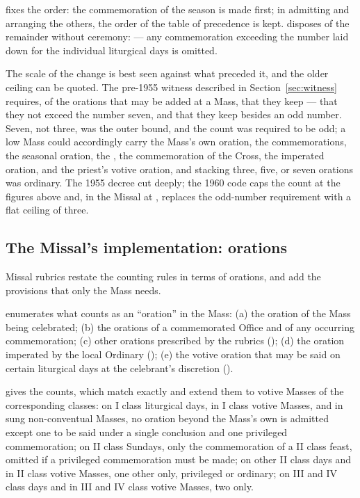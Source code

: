  fixes the order: the commemoration of the season is made first; in admitting and
arranging the others, the order of the table of precedence is kept.  disposes of the
remainder without ceremony:  — any commemoration exceeding the number laid down for
the individual liturgical days is omitted.

The scale of the change is best seen against what preceded it, and the older ceiling can be
quoted. The pre-1955 witness described in Section~\ref{sec:witness} requires, of the orations
that may be added at a Mass, that they  keep — that they not exceed the number seven, and that they keep besides an
odd number. Seven, not three, was the outer bound, and the count was required to be odd; a low
Mass could accordingly carry the Mass's own oration, the commemorations, the seasonal oration,
the , the commemoration of the Cross, the imperated oration, and the priest's
votive oration, and stacking three, five, or seven orations was ordinary. The 1955 decree cut
deeply; the 1960 code caps the count at the figures above and, in the Missal at ,
replaces the odd-number requirement with a flat ceiling of three.

\subsection{The Missal's implementation: orations}

Missal rubrics  restate the counting rules in terms of orations, and add the
provisions that only the Mass needs.

 enumerates what counts as an ``oration'' in the Mass: (a) the oration of the Mass being
celebrated; (b) the orations of a commemorated Office and of any occurring commemoration;
(c) other orations prescribed by the rubrics (); (d) the oration imperated by the
local Ordinary (); (e) the votive oration that may be said on certain liturgical
days at the celebrant's discretion ().

 gives the counts, which match  exactly and extend them to votive Masses of the
corresponding classes: on I class liturgical days, in I class votive Masses, and in sung
non-conventual Masses, no oration beyond the Mass's own is admitted except one to be said under
a single conclusion and one privileged commemoration; on II class Sundays, only the
commemoration of a II class feast, omitted if a privileged commemoration must be made; on other
II class days and in II class votive Masses, one other only, privileged or ordinary; on III and
IV class days and in III and IV class votive Masses, two only.

